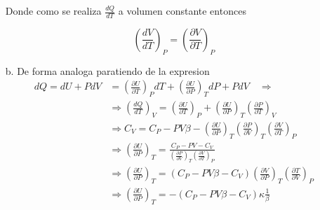 \documentclass[a4paper]{article}
\begin{document}
\begin{answer}[Problema 1]
\begin{itemize}
            Donde como se realiza $\frac{dQ}{dT}$ a volumen constante entonces 
    
            $$\left(\frac{dV}{dT}\right)_P = \left(\frac{\partial V}{\partial T}\right)_P$$  
            \item [b.] De forma analoga paratiendo de la expresion 
            \begin{align*}
                d Q = dU + PdV &=\left( \frac{\partial U}{\partial T} \right)_P dT + \left( \frac{\partial U}{\partial P} \right)_T dP + PdV \quad \Rightarrow\\
                & \Rightarrow \left(
                    \frac{dQ}{dT}
                \right)_V = \left( \frac{\partial U}{\partial T} \right)_P +  \left( \frac{\partial U}{\partial P} \right)_T \left( \frac{\partial P}{\partial T} \right)_V\\
                & \Rightarrow 
                C_V = C_P - PV \beta - \left( \frac{\partial U}{\partial P} \right)_T \left( \frac{\partial P}{\partial V} \right)_T \left( \frac{\partial V}{\partial T} \right)_P\\
                & \Rightarrow
                    \left( \frac{\partial U}{\partial P} \right)_T = \frac{C_P - PV - C_V}{\left( \frac{\partial P}{\partial V} \right)_T \left( \frac{\partial V}{\partial T} \right)_P}\\
                & \Rightarrow
                    \left( \frac{\partial U}{\partial P} \right)_T = (C_P - PV\beta - C_V)\left( \frac{\partial V}{\partial P} \right)_T \left( \frac{\partial T}{\partial V} \right)_P\\
                & \Rightarrow
                    \left( \frac{\partial U}{\partial P} \right)_T = -(C_P - PV\beta - C_V)\kappa \frac{1}{\beta}\\            \end{align*}\\
        \end{itemize}
        
    \end{answer}
    
\end{document}
